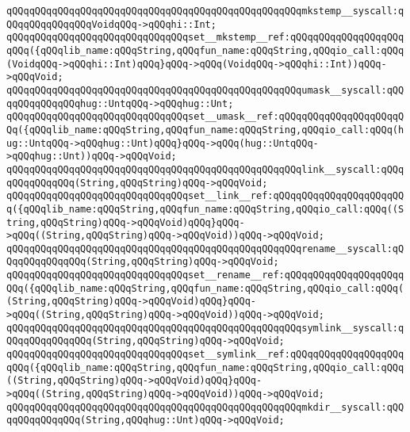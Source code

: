 \verb|qQQqqQQqqQQqqQQqqQQqqQQqqQQqqQQqqQQqqQQqqQQqqQQqqQQqmkstemp__syscall:qQQqqQQqqQQqqQQqVoidqQQq->qQQqhi::Int;|\newline
\verb|qQQqqQQqqQQqqQQqqQQqqQQqqQQqqQQqset__mkstemp__ref:qQQqqQQqqQQqqQQqqQQqqQQq({qQQqlib_name:qQQqString,qQQqfun_name:qQQqString,qQQqio_call:qQQq(VoidqQQq->qQQqhi::Int)qQQq}qQQq->qQQq(VoidqQQq->qQQqhi::Int))qQQq->qQQqVoid;|\newline
\newline
\verb|qQQqqQQqqQQqqQQqqQQqqQQqqQQqqQQqqQQqqQQqqQQqqQQqqQQqumask__syscall:qQQqqQQqqQQqqQQqhug::UntqQQq->qQQqhug::Unt;|\newline
\verb|qQQqqQQqqQQqqQQqqQQqqQQqqQQqqQQqset__umask__ref:qQQqqQQqqQQqqQQqqQQqqQQq({qQQqlib_name:qQQqString,qQQqfun_name:qQQqString,qQQqio_call:qQQq(hug::UntqQQq->qQQqhug::Unt)qQQq}qQQq->qQQq(hug::UntqQQq->qQQqhug::Unt))qQQq->qQQqVoid;|\newline
\newline
\verb|qQQqqQQqqQQqqQQqqQQqqQQqqQQqqQQqqQQqqQQqqQQqqQQqqQQqlink__syscall:qQQqqQQqqQQqqQQq(String,qQQqString)qQQq->qQQqVoid;|\newline
\verb|qQQqqQQqqQQqqQQqqQQqqQQqqQQqqQQqset__link__ref:qQQqqQQqqQQqqQQqqQQqqQQq({qQQqlib_name:qQQqString,qQQqfun_name:qQQqString,qQQqio_call:qQQq((String,qQQqString)qQQq->qQQqVoid)qQQq}qQQq->qQQq((String,qQQqString)qQQq->qQQqVoid))qQQq->qQQqVoid;|\newline
\newline
\verb|qQQqqQQqqQQqqQQqqQQqqQQqqQQqqQQqqQQqqQQqqQQqqQQqqQQqrename__syscall:qQQqqQQqqQQqqQQq(String,qQQqString)qQQq->qQQqVoid;|\newline
\verb|qQQqqQQqqQQqqQQqqQQqqQQqqQQqqQQqset__rename__ref:qQQqqQQqqQQqqQQqqQQqqQQq({qQQqlib_name:qQQqString,qQQqfun_name:qQQqString,qQQqio_call:qQQq((String,qQQqString)qQQq->qQQqVoid)qQQq}qQQq->qQQq((String,qQQqString)qQQq->qQQqVoid))qQQq->qQQqVoid;|\newline
\newline
\verb|qQQqqQQqqQQqqQQqqQQqqQQqqQQqqQQqqQQqqQQqqQQqqQQqqQQqsymlink__syscall:qQQqqQQqqQQqqQQq(String,qQQqString)qQQq->qQQqVoid;|\newline
\verb|qQQqqQQqqQQqqQQqqQQqqQQqqQQqqQQqset__symlink__ref:qQQqqQQqqQQqqQQqqQQqqQQq({qQQqlib_name:qQQqString,qQQqfun_name:qQQqString,qQQqio_call:qQQq((String,qQQqString)qQQq->qQQqVoid)qQQq}qQQq->qQQq((String,qQQqString)qQQq->qQQqVoid))qQQq->qQQqVoid;|\newline
\newline
\verb|qQQqqQQqqQQqqQQqqQQqqQQqqQQqqQQqqQQqqQQqqQQqqQQqqQQqmkdir__syscall:qQQqqQQqqQQqqQQq(String,qQQqhug::Unt)qQQq->qQQqVoid;|\newline
